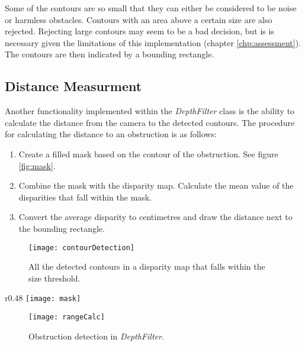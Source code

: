 Some of the contours are so small that they can either be considered to be noise or harmless obstacles. Contours with an area above a certain size are also rejected. Rejecting large contours may seem to be a bad decision, but is is necessary given the limitations of this implementation (chapter \ref{chp:assessment}). The contours are then indicated by a bounding rectangle.

\subsection{Distance Measurment}

Another functionality implemented within the \textit{DepthFilter} class is the ability to calculate the distance from the camera to the detected contours. The procedure for calculating the distance to an obstruction is as follows:

\begin{enumerate}
	\item Create a filled mask based on the contour of the obstruction. See figure \ref{fig:mask}.
	\item Combine the mask with the disparity map. Calculate the mean value of the disparities that fall within the mask.
	\item Convert the average disparity to centimetres and draw the distance next to the bounding rectangle.
	
\end{enumerate}

\begin{figure}
	\centering
	\texttt{[image: contourDetection]}
	\caption{All the detected contours in a disparity map that falls within the size threshold.}
	\label{fig:contourDetection}
\end{figure}

\begin{wrapfigure}{r}{0.48\textwidth}
	\vspace{-10pt} %
	\centering
	\texttt{[image: mask]}
	\caption{\label{fig:mask} A mask.}
	\vspace{-20pt} %
\end{wrapfigure}

\begin{figure}
	\centering
	\texttt{[image: rangeCalc]}
	\caption{Obstruction detection in \textit{DepthFilter}.}
	\label{fig:rangeCalc}
\end{figure}

